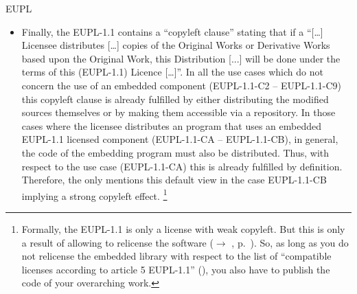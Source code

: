 \begin{license}{EUPL}
\begin{itemize}
\item Finally, the EUPL-1.1 contains a \enquote{copyleft clause} stating that if a
  \enquote{[\ldots] Licensee distributes [\ldots] copies of the Original Works
  or Derivative Works based upon the Original Work, this Distribution [...] will
  be done under the terms of this (EUPL-1.1) Licence [\ldots]}. In all the use cases
  which do not concern the use of an embedded component (EUPL-1.1-C2 -- EUPL-1.1-C9) this
  copyleft clause is already fulfilled by either distributing the modified
  sources themselves or by making them accessible via a repository. In those
  cases where the licensee distributes an program that uses an embedded EUPL-1.1
  licensed component (EUPL-1.1-CA -- EUPL-1.1-CB), in general, the code of the embedding
  program must also be distributed. Thus, with respect to the use case (EUPL-1.1-CA)
  this is already fulfilled by definition. Therefore, the \oslic{} only mentions
  this default view in the case EUPL-1.1-CB implying a strong copyleft effect.%
  \footnote{Formally, the EUPL-1.1 is only a license with weak copyleft. 
    But this is only a result of allowing to relicense the software
    ($\rightarrow$ \oslic, p.\ ). So, as long as
    you do not relicense the embedded library with respect to the list of
    \enquote{compatible licenses according to article 5 EUPL-1.1} 
    (\cite[cf.][\nopage wp §5 and Appendix]{EuplLicense2007en}), 
    you also have to publish the code of your overarching work.}

\end{itemize}

\end{license}

%

